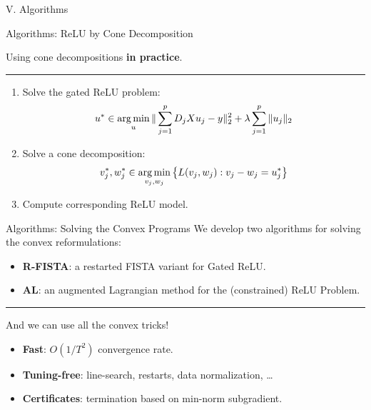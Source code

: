 \documentclass[usenames,dvipsnames,mathserif,notheorems]{beamer}
\newcommand{\horizontalrule}{
	{
			\vspace{-0.5em}
			\center \rule{\textwidth}{0.1em}
			\vspace{-0.2em}
		}
}
\begin{document}
\begin{frame}{}
	\begin{center}
		\huge V. Algorithms
	\end{center}
\end{frame}

\begin{frame}{Algorithms: ReLU by Cone Decomposition}
	\begin{center}
		\large Using cone decompositions \textbf{in practice}.
	\end{center}

	\pause
	\horizontalrule

	\begin{enumerate}
		\item Solve the gated ReLU problem:
		      \[
			      u^* \in \mathop{\rm arg\,min}_{u} \|\sum_{j=1}^p D_j X u_j - y\|_2^2 + \lambda \sum_{j=1}^p \|u_j\|_2
		      \]
		      \pause
		\item Solve a cone decomposition:
		      \[
			      v_j^*, w_j^* \in \mathop{\rm arg\,min}_{v_j, w_j} \left\{ L(v_j, w_j) : v_j - w_j = u^*_j\right\}
		      \]
		      \pause

		\item Compute corresponding ReLU model.
	\end{enumerate}

\end{frame}

\begin{frame}{Algorithms: Solving the Convex Programs}
	We develop two algorithms for solving the convex reformulations:

	\vspace{1em}

	\begin{itemize}
		\item \textbf{R-FISTA}: a restarted FISTA variant for Gated ReLU.
		      \vspace{0.5em}
		\item \textbf{AL}: an augmented Lagrangian method for the (constrained) ReLU Problem.
	\end{itemize}

	\pause
	\horizontalrule

	And we can use all the convex tricks!
	\vspace{1em}
	\begin{itemize}
		\item \textbf{Fast}: \( O(1/T^2) \) convergence rate.
		      \vspace{0.5em}

		\item \textbf{Tuning-free}: line-search, restarts, data normalization, \ldots
		      \vspace{0.5em}

		\item \textbf{Certificates}: termination based on min-norm subgradient.
	\end{itemize}

\end{frame}
\end{document}
